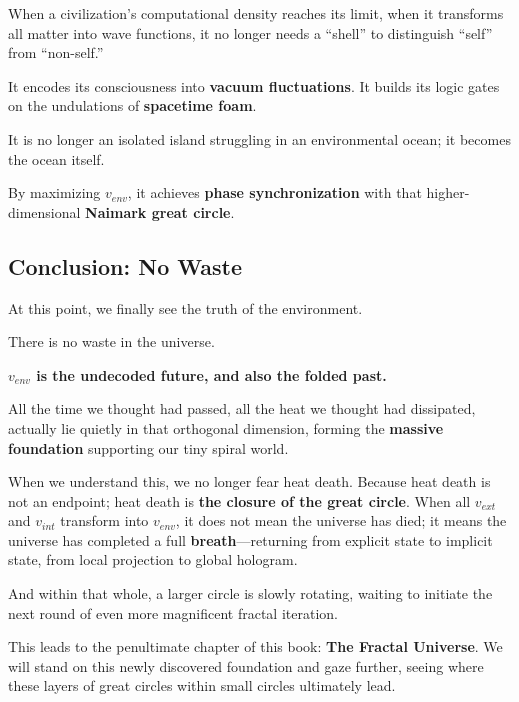 When a civilization's computational density reaches its limit, when it transforms all matter into wave functions, it no longer needs a ``shell'' to distinguish ``self'' from ``non-self.''

It encodes its consciousness into \textbf{vacuum fluctuations}. It builds its logic gates on the undulations of \textbf{spacetime foam}.

It is no longer an isolated island struggling in an environmental ocean; it becomes the ocean itself.

By maximizing $v_{env}$, it achieves \textbf{phase synchronization} with that higher-dimensional \textbf{Naimark great circle}.

\subsection{Conclusion: No Waste}

At this point, we finally see the truth of the environment.

There is no waste in the universe.

\textbf{$v_{env}$ is the undecoded future, and also the folded past.}

All the time we thought had passed, all the heat we thought had dissipated, actually lie quietly in that orthogonal dimension, forming the \textbf{massive foundation} supporting our tiny spiral world.

When we understand this, we no longer fear heat death. Because heat death is not an endpoint; heat death is \textbf{the closure of the great circle}. When all $v_{ext}$ and $v_{int}$ transform into $v_{env}$, it does not mean the universe has died; it means the universe has completed a full \textbf{breath}---returning from explicit state to implicit state, from local projection to global hologram.

And within that whole, a larger circle is slowly rotating, waiting to initiate the next round of even more magnificent fractal iteration.

This leads to the penultimate chapter of this book: \textbf{The Fractal Universe}. We will stand on this newly discovered foundation and gaze further, seeing where these layers of great circles within small circles ultimately lead.

